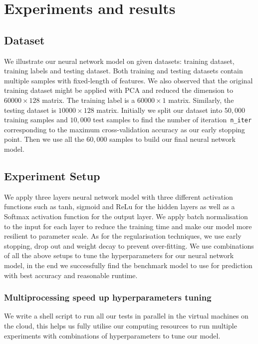 \section{Experiments and results}\label{chapter4}

\subsection{Dataset}
We illustrate our neural network model on given datasets: training dataset, training labels and testing dataset.
Both training and testing datasets contain multiple samples with fixed-length of features.
We also observed that the original training dataset might be applied with PCA and reduced the dimension to $60000 \times 128$ matrix.
The training label is a $60000 \times 1$ matrix.
Similarly, the testing dataset is $10000 \times 128$ matrix.
Initially we split our dataset into $50,000$ training samples and $10,000$ test samples to find the number of iteration~\texttt{n\_iter} corresponding to the maximum cross-validation accuracy as our early stopping point.
Then we use all the $60,000$ samples to build our final neural network model.

\subsection{Experiment Setup}
We apply three layers neural network model with three different activation functions such as tanh, sigmoid and ReLu for the hidden layers as well as a Softmax activation function for the output layer.
We apply batch normalisation to the input for each layer to reduce the training time and make our model more resilient to parameter scale.
As for the regularisation techniques,
we use early stopping, drop out and weight decay to prevent over-fitting.
We use combinations of all the above setups to tune the hyperparameters for our neural network model,
in the end we successfully find the benchmark model to use for prediction with best accuracy and reasonable runtime.

\subsubsection{Multiprocessing speed up hyperparameters tuning}
We write a shell script to run all our tests in parallel in the virtual machines on the cloud,
this helps us fully utilise our computing resources to run multiple experiments with combinations of hyperparameters to tune our model.

